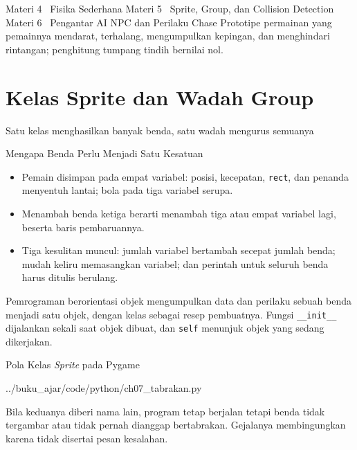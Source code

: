 \documentclass[aspectratio=169,10pt]{beamer}
\begin{document}
  {Materi 4 \textperiodcentered\ Fisika Sederhana}
  {Materi 5 \textperiodcentered\ Sprite, Group, dan Collision Detection}
  {Materi 6 \textperiodcentered\ Pengantar AI NPC dan Perilaku Chase}
  {Prototipe permainan yang pemainnya mendarat, terhalang, mengumpulkan
   kepingan, dan menghindari rintangan; penghitung tumpang tindih bernilai nol.}

\section{Kelas Sprite dan Wadah Group}
  {Satu kelas menghasilkan banyak benda, satu wadah mengurus semuanya}

\begin{frame}{Mengapa Benda Perlu Menjadi Satu Kesatuan}
\begin{itemize}
  \item Pemain disimpan pada empat variabel: posisi, kecepatan, \texttt{rect},
        dan penanda menyentuh lantai; bola pada tiga variabel serupa.
  \item Menambah benda ketiga berarti menambah tiga atau empat variabel lagi,
        beserta baris pembaruannya.
  \item Tiga kesulitan muncul: jumlah variabel bertambah secepat jumlah benda;
        mudah keliru memasangkan variabel; dan perintah untuk seluruh benda
        harus ditulis berulang.
\end{itemize}
\vspace{0.16cm}
\begin{kotak}
Pemrograman berorientasi objek mengumpulkan data dan perilaku sebuah benda
menjadi satu objek, dengan kelas sebagai resep pembuatnya. Fungsi
\texttt{\_\_init\_\_} dijalankan sekali saat objek dibuat, dan \texttt{self}
menunjuk objek yang sedang dikerjakan.
\end{kotak}
\end{frame}

\begin{frame}[fragile]{Pola Kelas \emph{Sprite} pada Pygame}

  {../buku_ajar/code/python/ch07_tabrakan.py}
\vspace{0.15cm}
\begin{peringatan}
Bila keduanya diberi nama lain, program tetap berjalan tetapi benda tidak
tergambar atau tidak pernah dianggap bertabrakan. Gejalanya membingungkan
karena tidak disertai pesan kesalahan.
\end{peringatan}
\end{frame}
\end{document}
